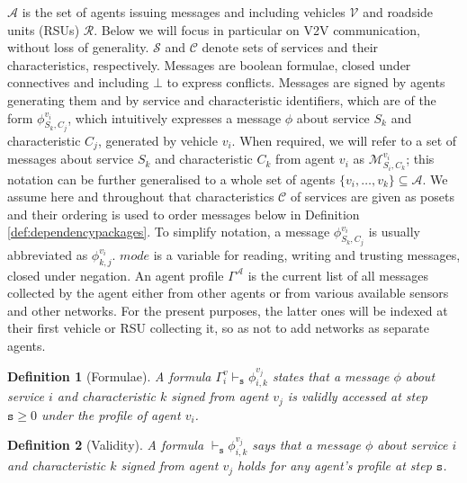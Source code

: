 \documentclass[compsoc, conference, letterpaper, 10pt, times]{IEEEtran}
\newtheorem{definition}{Definition}
\begin{document}
$\mathcal{A}$ is the set of agents issuing messages and including vehicles $\mathcal{V}$ and roadside units (RSUs) $\mathcal{R}$. Below we will focus in particular on V2V communication, without loss of generality. $\mathcal{S}$ and $\mathcal{C}$ denote sets of services and their characteristics, respectively. Messages are boolean formulae, closed under connectives and including $\bot$ to express conflicts. Messages are signed by agents generating them and by service and characteristic identifiers, which are of the form $\phi^{v_{i}}_{S_{k},C_{j}}$, which intuitively expresses a  message $\phi$ about service $S_k$ and characteristic $C_j$,  generated by vehicle $v_{i}$. When required, we will refer to a set of messages about service $S_{k}$ and characteristic $C_{k}$ from agent $v_{i}$ as $\mathcal{M}^{v_{i}}_{S_{i}, C_{k}}$; this notation can be further generalised to a whole set of agents $\{v_{i}, \dots, v_{k}\} \subseteq  \mathcal{A}$. We assume here and throughout that characteristics $\mathcal{C}$ of services are given as posets and their ordering is used to order messages below in Definition \ref{def:dependencypackages}. 
To simplify notation, a message $\phi^{v_{i}}_{S_{k},C_{j}}$ is usually abbreviated as $\phi^{v_{i}}_{{k},{j}}$. $mode$ is a variable for reading, writing and trusting messages, closed under negation. An agent profile $\Gamma^{\mathcal{A}}$ is the current list of all messages collected by the agent either from other agents or from various available sensors and other networks. For the present purposes, the latter ones will be indexed at their first vehicle or RSU collecting it, so as not to add networks as separate agents.


\begin{definition}[Formulae]
A formula $\Gamma^{v}_{i} \vdash_{\mathtt{s}} \phi^{v_{j}}_{i,k}$ states that a message $\phi$ about service $i$ and characteristic $k$ signed from agent $v_{j}$  is validly accessed at step $\mathtt{s}\geq 0$ under the profile of agent $v_{i}$.
\end{definition}

\begin{definition}[Validity]
A formula $\vdash_{\mathtt{s}} \phi^{v_{j}}_{i,k}$ says that a message $\phi$  about service $i$ and characteristic $k$ signed from agent $v_{j}$ holds for \textit{any} agent's profile at step $\mathtt{s}$.
\end{definition}
\end{document}
